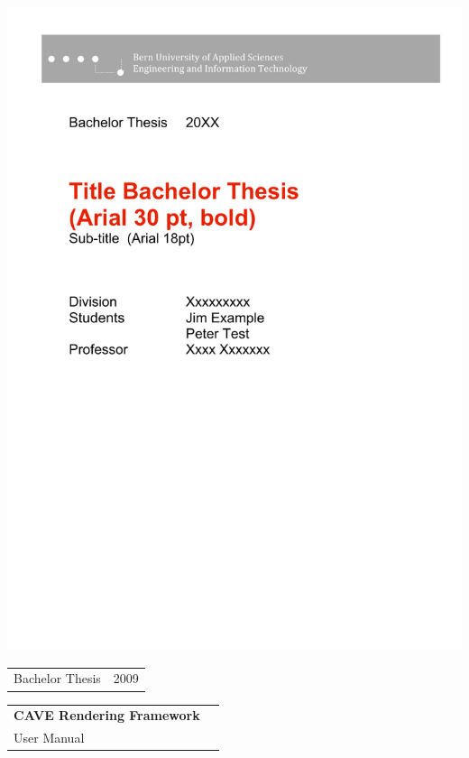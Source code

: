 \begin{titlepage}
 
\begin{flushleft}

\vspace*{-2in}\includegraphics[scale=1.1]{../tex-include/figures/title_header}

\vspace*{2in}

\begin{tabular}{p{5cm}p{8cm}}
\Large{Bachelor Thesis} & \Large{2009} \\ 
\end{tabular}

\vspace{1.8cm}
\begin{tabular}{ll}
\Huge{\bfseries CAVE Rendering Framework}\\[0.3cm]
\huge{User Manual}\\[1.8cm]
\end{tabular}


\end{flushleft}
\end{titlepage}
